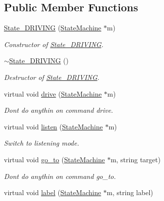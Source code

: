 \subsection*{Public Member Functions}
\begin{DoxyCompactItemize}
\item 
\hyperlink{class_state___d_r_i_v_i_n_g_a54b0c8690994358c52b409d17bc413b5}{State\+\_\+\+D\+R\+I\+V\+I\+NG} (\hyperlink{class_state_machine}{State\+Machine} $\ast$m)
\begin{DoxyCompactList}\small\item\em Constructor of \hyperlink{class_state___d_r_i_v_i_n_g}{State\+\_\+\+D\+R\+I\+V\+I\+NG}. \end{DoxyCompactList}\item 
\hyperlink{class_state___d_r_i_v_i_n_g_a0770c3991f746520e21e1c7e12610f1d}{$\sim$\+State\+\_\+\+D\+R\+I\+V\+I\+NG} ()
\begin{DoxyCompactList}\small\item\em Destructor of \hyperlink{class_state___d_r_i_v_i_n_g}{State\+\_\+\+D\+R\+I\+V\+I\+NG}. \end{DoxyCompactList}\item 
virtual void \hyperlink{class_state___d_r_i_v_i_n_g_a7239b366223065ebd5bbbff2330efb0c}{drive} (\hyperlink{class_state_machine}{State\+Machine} $\ast$m)
\begin{DoxyCompactList}\small\item\em Don\textquotesingle{}t do anythin on command drive. \end{DoxyCompactList}\item 
virtual void \hyperlink{class_state___d_r_i_v_i_n_g_a35fd6129ede7020827f4a2a8632b1527}{listen} (\hyperlink{class_state_machine}{State\+Machine} $\ast$m)
\begin{DoxyCompactList}\small\item\em Switch to listening mode. \end{DoxyCompactList}\item 
virtual void \hyperlink{class_state___d_r_i_v_i_n_g_a83631cdbe860c6fa1b965fe01337bb5f}{go\+\_\+to} (\hyperlink{class_state_machine}{State\+Machine} $\ast$m, string target)
\begin{DoxyCompactList}\small\item\em Don\textquotesingle{}t do anythin on command go\+\_\+to. \end{DoxyCompactList}\item 
virtual void \hyperlink{class_state___d_r_i_v_i_n_g_a3826ccfb3b2b4a63c2f9bc243ea403c8}{label} (\hyperlink{class_state_machine}{State\+Machine} $\ast$m, string label)

\end{DoxyCompactItemize}
